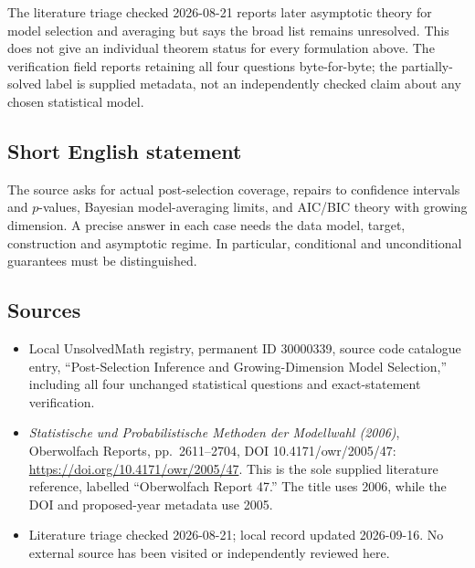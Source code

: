 \documentclass[11pt]{article}
\begin{document}
The literature triage checked 2026-08-21 reports later asymptotic theory for model selection and averaging but says the broad list remains unresolved. This does not give an individual theorem status for every formulation above. The verification field reports retaining all four questions byte-for-byte; the partially-solved label is supplied metadata, not an independently checked claim about any chosen statistical model.
\subsection{Short English statement}
The source asks for actual post-selection coverage, repairs to confidence intervals and \(p\)-values, Bayesian model-averaging limits, and AIC/BIC theory with growing dimension. A precise answer in each case needs the data model, target, construction and asymptotic regime. In particular, conditional and unconditional guarantees must be distinguished.
\subsection{Sources}
\begin{itemize}
\item Local UnsolvedMath registry, permanent ID 30000339, source code catalogue entry, ``Post-Selection Inference and Growing-Dimension Model Selection,'' including all four unchanged statistical questions and exact-statement verification.
\item \emph{Statistische und Probabilistische Methoden der Modellwahl (2006)}, Oberwolfach Reports, pp.\ 2611--2704, DOI 10.4171/owr/2005/47: \url{https://doi.org/10.4171/owr/2005/47}. This is the sole supplied literature reference, labelled ``Oberwolfach Report 47.'' The title uses 2006, while the DOI and proposed-year metadata use 2005.
\item Literature triage checked 2026-08-21; local record updated 2026-09-16. No external source has been visited or independently reviewed here.
\end{itemize}
\end{document}
